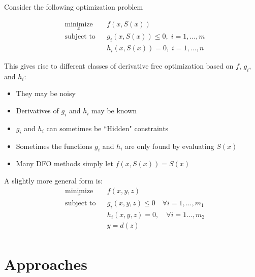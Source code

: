 \documentclass{article} %
\begin{document}
\subsection{}
Consider the following optimization problem

\begin{equation*}
\begin{aligned}
& \underset{x}{\text{minimize}} & & f(x, S(x)) \\
& \text{subject to} & & g_i(x, S(x)) \leq 0, \; i = 1, \ldots, m \\
& & & h_i(x, S(x)) = 0, \; i = 1, \ldots, n 
\end{aligned}
\end{equation*}

This gives rise to different classes of derivative free optimization based on $f$, $g_i$, and $h_i$:
\begin{itemize}
\item They may be noisy
\item Derivatives of $g_i$ and $h_i$ may be known
\item $g_i$ and $h_i$ can sometimes be ``Hidden" constraints
\item Sometimes the functions $g_i$ and $h_i$ are only found by evaluating $S(x)$
\item Many DFO methods simply let $f(x,S(x)) = S(x)$
\end{itemize}

A slightly more general form is:
\begin{equation*}
\begin{aligned}
& \underset{x}{\text{minimize}} & & f(x, y, z) \\
& \text{subject to} & & g_i(x, y, z) \leq 0 \quad \forall i = 1, \ldots, m_1 \\
& & & h_i(x, y, z) = 0, \quad \forall i = 1 \ldots, m_2 \\
& & & y = d(z) \;  \\
\end{aligned}
\end{equation*}



\section{Approaches}
\end{document}
